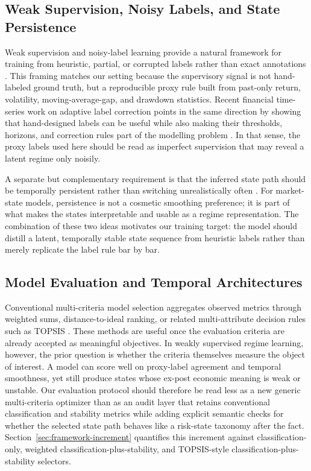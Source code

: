 \documentclass[a4paper,fleqn]{cas-dc}
\begin{document}
\subsection{Weak Supervision, Noisy Labels, and State Persistence}
Weak supervision and noisy-label learning provide a natural framework for training from heuristic, partial, or corrupted labels rather than exact annotations \cite{ratner2020snorkel,zhang2022programmatic,zhou2018weakly,hernandez2016taxonomy,schwenker2014partial,natarajan2013noisy,frenay2014labelnoise,song2023noisylabels,tonolini2023wsvae}. This framing matches our setting because the supervisory signal is not hand-labeled ground truth, but a reproducible proxy rule built from past-only return, volatility, moving-average-gap, and drawdown statistics. Recent financial time-series work on adaptive label correction points in the same direction by showing that hand-designed labels can be useful while also making their thresholds, horizons, and correction rules part of the modelling problem \cite{yang2024metalabel}. In that sense, the proxy labels used here should be read as imperfect supervision that may reveal a latent regime only noisily.

A separate but complementary requirement is that the inferred state path should be temporally persistent rather than switching unrealistically often \cite{nystrup2020persistent,bemporad2018jump,livieris2021smoothing,blumke2022structuralhmm}. For market-state models, persistence is not a cosmetic smoothing preference; it is part of what makes the states interpretable and usable as a regime representation. The combination of these two ideas motivates our training target: the model should distill a latent, temporally stable state sequence from heuristic labels rather than merely replicate the label rule bar by bar.

\subsection{Model Evaluation and Temporal Architectures}
Conventional multi-criteria model selection aggregates observed metrics through weighted sums, distance-to-ideal ranking, or related multi-attribute decision rules such as TOPSIS \cite{hwang1981madm}. These methods are useful once the evaluation criteria are already accepted as meaningful objectives. In weakly supervised regime learning, however, the prior question is whether the criteria themselves measure the object of interest. A model can score well on proxy-label agreement and temporal smoothness, yet still produce states whose ex-post economic meaning is weak or unstable. Our evaluation protocol should therefore be read less as a new generic multi-criteria optimizer than as an audit layer that retains conventional classification and stability metrics while adding explicit semantic checks for whether the selected state path behaves like a risk-state taxonomy after the fact. Section~\ref{sec:framework-increment} quantifies this increment against classification-only, weighted classification-plus-stability, and TOPSIS-style classification-plus-stability selectors.
\end{document}
